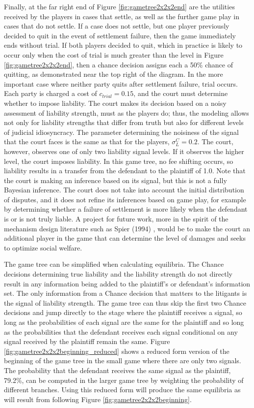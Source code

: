 \documentclass{article}
\begin{document}
Finally, at the far right end of Figure \ref{fig:gametree2x2x2end} are the utilities received by the players in cases that settle, as well as the further game play in cases that do not settle. If a case does not settle, but one player previously decided to quit in the event of settlement failure, then the game immediately ends without trial. If both players decided to quit, which in practice is likely to occur only when the cost of trial is much greater than the level in Figure \ref{fig:gametree2x2x2end}, then a chance decision assigns each a 50\% chance of quitting, as demonstrated near the top right of the diagram. In the more important case where neither party quits after settlement failure, trial occurs. Each party is charged a cost of $c_{trial}=0.15$, and  the court must determine whether to impose liability. The court makes its decision based on a noisy assessment of liability strength, must as the players do; thus, the modeling allows not only for liability strengths that differ from truth but also for different levels of judicial idiosyncracy. The parameter determining the noisiness of the signal that the court faces is the same as that for the players, $\sigma_{L}^C=0.2$. The court, however, observes one of only two liability signal levels. If it observes the higher level, the court imposes liability. In this game tree, no fee shifting occurs, so liability results in a transfer from the defendant to the plaintiff of 1.0.  Note that the court is making an inference based on its signal, but this is not a fully Bayesian inference. The court does not take into account the initial distribution of disputes, and it does not refine its inferences based on game play, for example by determining whether a failure of settlement is more likely when the defendant is or is not truly liable. A project for future work, more in the spirit of the mechanism design literature such as Spier (1994) \cite{spier}, would be to make the court an additional player in the game that can determine the level of damages and seeks to optimize social welfare.

The game tree can be simplified when calculating equilibria. The Chance decisions determining true liability and the liability strength do not directly result in any information being added to the plaintiff's or defendant's information set. The only information from a Chance decision that matters to the litigants is the signal of liability strength. The game tree can thus skip the first two Chance decisions and jump directly to the stage where the plaintiff receives a signal, so long as the probabilities of each signal are the same for the plaintiff and so long as the probabilities that the defendant receives each signal conditional on any signal received by the plaintiff remain the same. Figure \ref{fig:gametree2x2x2beginning_reduced} shows a reduced form version of the beginning of the game tree in the small game where there are only two signals. The probability that the defendant receives the same signal as the plaintiff, 79.2\%, can be computed in the larger game tree by weighting the probability of different branches. Using this reduced form will produce the same equilibria as will result from following Figure \ref{fig:gametree2x2x2beginning}. 
\end{document}
